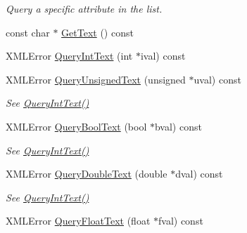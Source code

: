 \begin{DoxyCompactItemize}
\begin{DoxyCompactList}\small\item\em Query a specific attribute in the list. \end{DoxyCompactList}\item 
const char $\ast$ \hyperlink{classtinyxml2_1_1_x_m_l_element_a56cc727044dad002b978256754d43a4b}{Get\-Text} () const 
\item 
X\-M\-L\-Error \hyperlink{classtinyxml2_1_1_x_m_l_element_a71327c9a9d8840562bd204f46d0a7189}{Query\-Int\-Text} (int $\ast$ival) const 
\item 
\hypertarget{classtinyxml2_1_1_x_m_l_element_a2192091dec0c06be8b14f4e912c01758}{X\-M\-L\-Error \hyperlink{classtinyxml2_1_1_x_m_l_element_a2192091dec0c06be8b14f4e912c01758}{Query\-Unsigned\-Text} (unsigned $\ast$uval) const }\label{classtinyxml2_1_1_x_m_l_element_a2192091dec0c06be8b14f4e912c01758}

\begin{DoxyCompactList}\small\item\em See \hyperlink{classtinyxml2_1_1_x_m_l_element_a71327c9a9d8840562bd204f46d0a7189}{Query\-Int\-Text()} \end{DoxyCompactList}\item 
\hypertarget{classtinyxml2_1_1_x_m_l_element_afeb060672fa934163fc573e692b7fe38}{X\-M\-L\-Error \hyperlink{classtinyxml2_1_1_x_m_l_element_afeb060672fa934163fc573e692b7fe38}{Query\-Bool\-Text} (bool $\ast$bval) const }\label{classtinyxml2_1_1_x_m_l_element_afeb060672fa934163fc573e692b7fe38}

\begin{DoxyCompactList}\small\item\em See \hyperlink{classtinyxml2_1_1_x_m_l_element_a71327c9a9d8840562bd204f46d0a7189}{Query\-Int\-Text()} \end{DoxyCompactList}\item 
\hypertarget{classtinyxml2_1_1_x_m_l_element_aad931c42548907dbea416f7365d78b57}{X\-M\-L\-Error \hyperlink{classtinyxml2_1_1_x_m_l_element_aad931c42548907dbea416f7365d78b57}{Query\-Double\-Text} (double $\ast$dval) const }\label{classtinyxml2_1_1_x_m_l_element_aad931c42548907dbea416f7365d78b57}

\begin{DoxyCompactList}\small\item\em See \hyperlink{classtinyxml2_1_1_x_m_l_element_a71327c9a9d8840562bd204f46d0a7189}{Query\-Int\-Text()} \end{DoxyCompactList}\item 
\hypertarget{classtinyxml2_1_1_x_m_l_element_a11fa26e1dbca88e973964c1d9b597658}{X\-M\-L\-Error \hyperlink{classtinyxml2_1_1_x_m_l_element_a11fa26e1dbca88e973964c1d9b597658}{Query\-Float\-Text} (float $\ast$fval) const }\label{classtinyxml2_1_1_x_m_l_element_a11fa26e1dbca88e973964c1d9b597658}


\end{DoxyCompactItemize}
